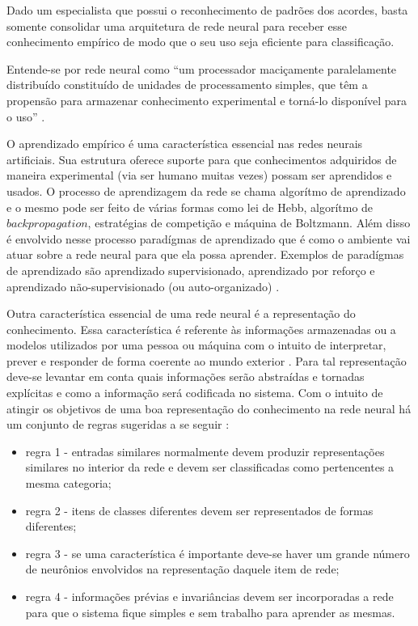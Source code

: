 Dado um especialista que possui o reconhecimento de padrões dos acordes, basta somente consolidar uma arquitetura de rede neural para receber esse conhecimento empírico de modo que o seu uso seja eficiente para classificação.

Entende-se por rede neural como ``um processador maciçamente paralelamente distribuído constituído de unidades de processamento simples, que têm a propensão para armazenar conhecimento experimental e torná-lo disponível para o uso'' \cite{haykin2009neural}.

O aprendizado empírico é uma característica essencial nas redes neurais artificiais. Sua estrutura oferece suporte para que conhecimentos adquiridos de maneira experimental (via ser humano muitas vezes) possam ser aprendidos e usados. O processo de aprendizagem da rede se chama algorítmo de aprendizado e o mesmo pode ser feito de várias formas como lei de Hebb, algorítmo de $backpropagation$, estratégias de competição e máquina de Boltzmann. Além disso é envolvido nesse processo paradígmas de aprendizado que é como o ambiente vai atuar sobre a rede neural para que ela possa aprender. Exemplos de paradígmas de aprendizado são aprendizado supervisionado, aprendizado por reforço e aprendizado não-supervisionado (ou auto-organizado) \cite{haykin2009neural}.

Outra característica essencial de uma rede neural é a representação do conhecimento. Essa característica é referente às informações armazenadas ou a modelos utilizados por uma pessoa ou máquina com o intuito de interpretar, prever e responder de forma coerente ao mundo exterior \cite{haykin2009neural}. Para tal representação deve-se levantar em conta quais informações serão abstraídas e tornadas explícitas e como a informação será codificada no sistema. Com o intuito de atingir os objetivos de uma boa representação do conhecimento na rede neural há um conjunto de regras sugeridas a se seguir \cite{haykin2009neural}:
\begin{itemize}
	\item regra 1 - entradas similares normalmente devem produzir representações similares no interior da rede e devem ser classificadas como pertencentes a mesma categoria;
	\item regra 2 - itens de classes diferentes devem ser representados de formas diferentes;
	\item regra 3 - se uma característica é importante deve-se haver um grande número de neurônios envolvidos na representação daquele item de rede;
	\item regra 4 - informações prévias e invariâncias devem ser incorporadas a rede para que o sistema fique simples e sem trabalho para aprender as mesmas.
\end{itemize}

